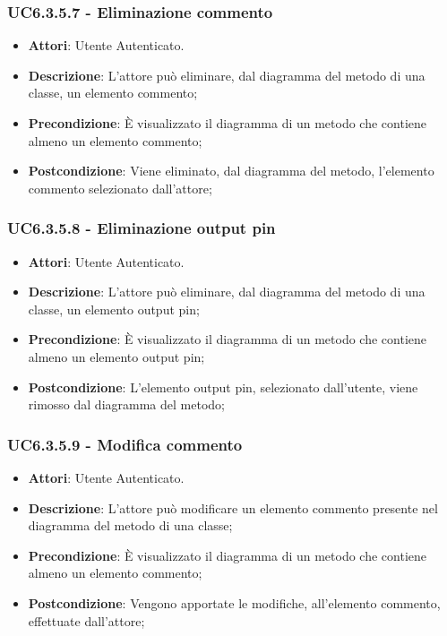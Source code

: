 \subsubsection{UC6.3.5.7 - Eliminazione commento} 
\label{sssec:UC6.3.5.7} 
\begin{itemize} 
\item \textbf{Attori}: Utente Autenticato.
\item \textbf{Descrizione}: L'attore può eliminare, dal diagramma del metodo di una classe, un elemento commento;
\item \textbf{Precondizione}: È visualizzato il diagramma di un metodo che contiene almeno un elemento commento;
\item \textbf{Postcondizione}: Viene eliminato, dal diagramma del metodo,  l'elemento commento selezionato dall'attore;
\end{itemize} 
\subsubsection{UC6.3.5.8 - Eliminazione output pin} 
\label{sssec:UC6.3.5.8} 
\begin{itemize} 
\item \textbf{Attori}: Utente Autenticato.
\item \textbf{Descrizione}: L'attore può eliminare, dal diagramma del metodo di una classe, un elemento output pin;
\item \textbf{Precondizione}: È visualizzato il diagramma di un metodo che contiene almeno un elemento output pin;
\item \textbf{Postcondizione}: L'elemento output pin, selezionato dall'utente, viene rimosso dal diagramma del metodo;
\end{itemize} 
\subsubsection{UC6.3.5.9 - Modifica commento} 
\label{sssec:UC6.3.5.9} 
\begin{itemize} 
\item \textbf{Attori}: Utente Autenticato.
\item \textbf{Descrizione}: L'attore può modificare un elemento commento presente nel diagramma del metodo di una classe;
\item \textbf{Precondizione}: È visualizzato il diagramma di un metodo che contiene almeno un elemento commento;
\item \textbf{Postcondizione}: Vengono apportate le modifiche, all'elemento commento, effettuate dall'attore;
\end{itemize} 
